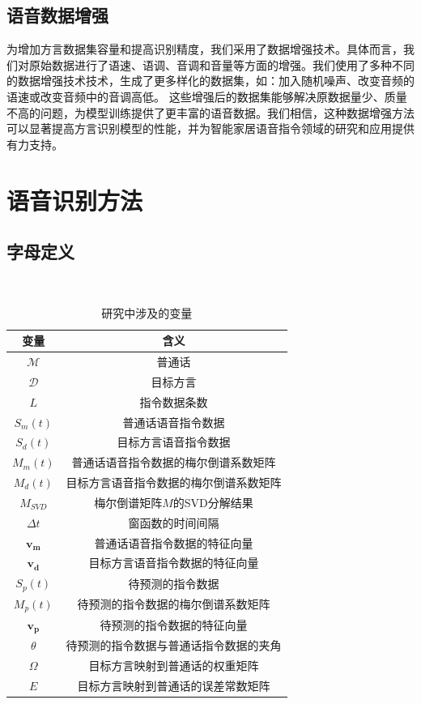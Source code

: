 \documentclass[lang=cn,cite=super]{elegantpaper}
\begin{document}
\subsection{语音数据增强}
为增加方言数据集容量和提高识别精度，我们采用了数据增强技术。具体而言，我们对原始数据进行了语速、语调、音调和音量等方面的增强。我们使用了多种不同的数据增强技术技术，生成了更多样化的数据集，如：加入随机噪声、改变音频的语速或改变音频中的音调高低。
这些增强后的数据集能够解决原数据量少、质量不高的问题，为模型训练提供了更丰富的语音数据。我们相信，这种数据增强方法可以显著提高方言识别模型的性能，并为智能家居语音指令领域的研究和应用提供有力支持。
\section{语音识别方法}
\subsection{字母定义}
\begin{table}[h]
    \caption{\label{tab:2} 研究中涉及的变量}\
    \begin{center}
        \begin{tabular}{cc}
            \hline
            \textbf{变量} & \textbf{含义}\\
            \hline \hline
            $\mathcal{M}$ & 普通话\\
            $\mathcal{D}$ & 目标方言\\
            $L$ & 指令数据条数\\
            $S_m(t)$ & 普通话语音指令数据\\
            $S_d(t)$ & 目标方言语音指令数据\\
            $M_m(t)$ & 普通话语音指令数据的梅尔倒谱系数矩阵\\
            $M_d(t)$ & 目标方言语音指令数据的梅尔倒谱系数矩阵\\
            $M_{SVD}$ & 梅尔倒谱矩阵$M$的SVD分解结果\\
            $\Delta t$ & 窗函数的时间间隔\\
            $\bm{v_m}$ & 普通话语音指令数据的特征向量\\
            $\bm{v_d}$ & 目标方言语音指令数据的特征向量\\
            $S_p(t)$ & 待预测的指令数据\\
            $M_p(t)$ & 待预测的指令数据的梅尔倒谱系数矩阵\\
            $\bm{v_p}$ & 待预测的指令数据的特征向量\\
            $\theta$ & 待预测的指令数据与普通话指令数据的夹角\\
            $\Omega$ & 目标方言映射到普通话的权重矩阵\\
            $E$ & 目标方言映射到普通话的误差常数矩阵\\
            \hline
        \end{tabular}
    \end{center}
\end{table}
\end{document}

